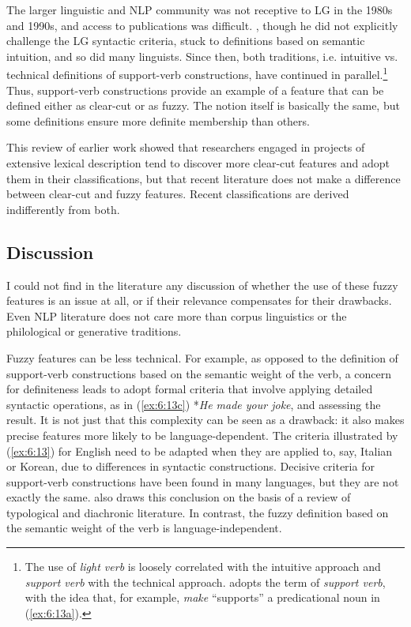 \documentclass[output=paper]{langsci/langscibook}
\begin{document}
The larger linguistic and NLP community was not receptive to LG in the 1980s and 1990s, and access to publications was difficult. \citet{Cattell1984}, though he did not explicitly challenge the LG syntactic criteria, stuck to definitions based on semantic intuition, and so did many linguists. Since then, both traditions, i.e. intuitive vs. technical definitions of support-verb constructions, have continued in parallel.\footnote{ The use of \textit{light verb} is loosely correlated with the intuitive approach and \textit{support verb} with the technical approach. \citet[12]{Gross1981} adopts the term of \textit{support verb}, with the idea that, for example, \textit{make} “supports” a predicational noun in (\ref{ex:6:13a}).} Thus, support-verb constructions provide an example of a feature that can be defined either as clear-cut or as fuzzy. The notion itself is basically the same, but some definitions ensure more definite membership than others.

This review of earlier work showed that researchers engaged in projects of extensive lexical description tend to discover more clear-cut features and adopt them in their classifications, but that recent literature does not make a difference between clear-cut and fuzzy features. Recent classifications are derived indifferently from both.

\subsection{Discussion}
\label{fuzzyfeaturediscussion}

I could not find in the literature any discussion of whether the use of these fuzzy features is an issue at all, or if their relevance compensates for their drawbacks. Even NLP literature does not care more than corpus linguistics or the philological or generative traditions.

Fuzzy features can be less technical. For example, as opposed to the definition of support-verb constructions based on the semantic weight of the verb, a concern for definiteness leads to adopt formal criteria that involve applying detailed syntactic operations, as in (\ref{ex:6:13c}) *\textit{He made your joke}, and assessing the result. It is not just that this complexity can be seen as a drawback: it also makes precise features more likely to be language-dependent. The criteria illustrated by (\ref{ex:6:13}) for English need to be adapted when they are applied to, say, Italian or Korean, due to differences in syntactic constructions. Decisive criteria for support-verb constructions have been found in many languages, but they are not exactly the same. \citet{Butt2010} also draws this conclusion on the basis of a review of typological and diachronic literature. In contrast, the fuzzy definition based on the semantic weight of the verb is language-independent.
\end{document}
